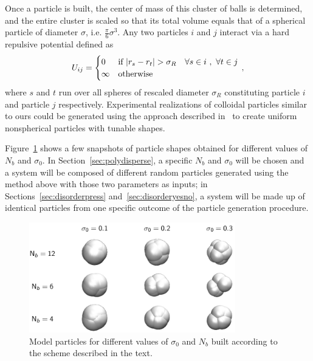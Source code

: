 Once a particle is built, the center of mass of this cluster of balls is determined, and the entire cluster is scaled so that its total volume equals that of a spherical particle of diameter $\sigma$, i.e. $\frac{\pi}{6}\sigma^3$.
Any two particles $i$ and $j$ interact via a hard repulsive potential defined as
\begin{equation}
U_{ij}=
\begin{cases}
0 & {\textrm{if }} |r_s-r_t|>\sigma_R \,\,\,\,\,\,\forall s\in i \,\,,\,\, \forall t\in j \cr
\infty &\text{otherwise}\cr
\end{cases} \,,
\end{equation}
where $s$ and $t$ run over all spheres of rescaled diameter $\sigma_R$ constituting particle $i$ and particle $j$ respectively.
Experimental realizations of colloidal particles similar to ours could be generated using the approach described in~\cite{weitz} to create uniform nonspherical particles with tunable shapes.  

Figure~\ref{shapes} shows a few snapshots of particle shapes obtained for different values of $N_b$ and  $\sigma_0$.
In Section~\ref{sec:polydisperse}, a specific $N_b$ and $\sigma_0$ will be chosen and a system will be composed of different random particles generated using the method above with those two parameters as inputs; in Sections~\ref{sec:disorderpress} and~\ref{sec:disorderyesno}, a system will be made up of identical particles from one specific outcome of the particle generation procedure.
\begin{figure}
	\begin{center}\includegraphics[width=0.8\textwidth]{disorder/parts2.png}\end{center}
	\caption[Model particles for different values of $\sigma_0$ and $N_b$]{Model particles for different values of $\sigma_0$ and $N_b$ built according to the scheme described in the text.}\label{shapes}
\end{figure}

